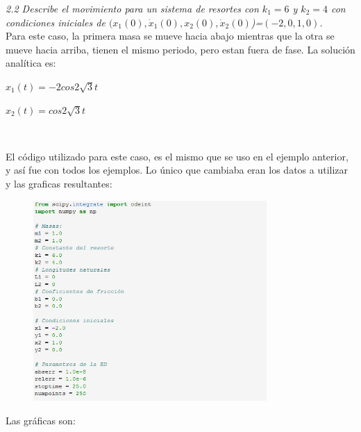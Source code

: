 \documentclass[12pt]{article}
\begin{document}
\noindent \textit{2.2 Describe el movimiento para un sistema de resortes con $k_1=6$ y $k_2=4$ con condiciones iniciales de $(x_1(0), \dot x_1(0), x_2(0), \dot x_2(0)$)=$(-2,0,1,0)$.}\\

Para este caso, la primera masa se mueve hacia abajo mientras que la otra se mueve hacia arriba, tienen el mismo periodo, pero estan fuera de fase. La solución analítica es: \\

\centerline{$x_1(t) = -2 cos 2\sqrt 3 t$}
\centerline{$x_2(t) = cos 2\sqrt 3 t$}
$ $

El código utilizado para este caso, es el mismo que se uso en el ejemplo anterior, y así fue con todos los ejemplos. Lo único que cambiaba eran los datos a utilizar y las graficas resultantes: 

\begin{figure}[h!]
    \centering
\includegraphics[width=3.5in]{Cod5.png}
\end{figure}

Las gráficas son:
\end{document}
